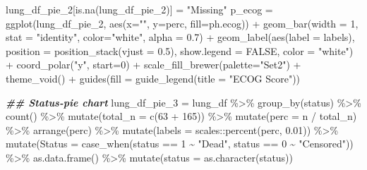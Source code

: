 \documentclass[
]{article}
\newenvironment{Shaded}{\begin{snugshade}}{\end{snugshade}}
\newcommand{\AttributeTok}[1]{\textcolor[rgb]{0.77,0.63,0.00}{#1}}
\newcommand{\ConstantTok}[1]{\textcolor[rgb]{0.00,0.00,0.00}{#1}}
\newcommand{\DecValTok}[1]{\textcolor[rgb]{0.00,0.00,0.81}{#1}}
\newcommand{\DocumentationTok}[1]{\textcolor[rgb]{0.56,0.35,0.01}{\textbf{\textit{#1}}}}
\newcommand{\FloatTok}[1]{\textcolor[rgb]{0.00,0.00,0.81}{#1}}
\newcommand{\FunctionTok}[1]{\textcolor[rgb]{0.00,0.00,0.00}{#1}}
\newcommand{\NormalTok}[1]{#1}
\newcommand{\OtherTok}[1]{\textcolor[rgb]{0.56,0.35,0.01}{#1}}
\newcommand{\SpecialCharTok}[1]{\textcolor[rgb]{0.00,0.00,0.00}{#1}}
\newcommand{\StringTok}[1]{\textcolor[rgb]{0.31,0.60,0.02}{#1}}
\begin{document}
\begin{Shaded}
\begin{Highlighting}[]
\NormalTok{lung\_df\_pie\_2[}\FunctionTok{is.na}\NormalTok{(lung\_df\_pie\_2)] }\OtherTok{=} \StringTok{"Missing"}
\NormalTok{p\_ecog }\OtherTok{=} 
  \FunctionTok{ggplot}\NormalTok{(lung\_df\_pie\_2, }\FunctionTok{aes}\NormalTok{(}\AttributeTok{x=}\StringTok{""}\NormalTok{, }\AttributeTok{y=}\NormalTok{perc, }\AttributeTok{fill=}\NormalTok{ph.ecog)) }\SpecialCharTok{+} 
  \FunctionTok{geom\_bar}\NormalTok{(}\AttributeTok{width =} \DecValTok{1}\NormalTok{, }\AttributeTok{stat =} \StringTok{"identity"}\NormalTok{, }\AttributeTok{color=}\StringTok{"white"}\NormalTok{, }\AttributeTok{alpha =} \FloatTok{0.7}\NormalTok{) }\SpecialCharTok{+} 
  \FunctionTok{geom\_label}\NormalTok{(}\FunctionTok{aes}\NormalTok{(}\AttributeTok{label =}\NormalTok{ labels),}
             \AttributeTok{position =} \FunctionTok{position\_stack}\NormalTok{(}\AttributeTok{vjust =} \FloatTok{0.5}\NormalTok{),}
             \AttributeTok{show.legend =} \ConstantTok{FALSE}\NormalTok{,}
             \AttributeTok{color =} \StringTok{"white"}\NormalTok{) }\SpecialCharTok{+}
  \FunctionTok{coord\_polar}\NormalTok{(}\StringTok{"y"}\NormalTok{, }\AttributeTok{start=}\DecValTok{0}\NormalTok{) }\SpecialCharTok{+}
  \FunctionTok{scale\_fill\_brewer}\NormalTok{(}\AttributeTok{palette=}\StringTok{"Set2"}\NormalTok{) }\SpecialCharTok{+}
  \FunctionTok{theme\_void}\NormalTok{() }\SpecialCharTok{+}
  \FunctionTok{guides}\NormalTok{(}\AttributeTok{fill =} \FunctionTok{guide\_legend}\NormalTok{(}\AttributeTok{title =} \StringTok{"ECOG Score"}\NormalTok{))}

\DocumentationTok{\#\# Status{-}pie chart}
\NormalTok{lung\_df\_pie\_3 }\OtherTok{=}\NormalTok{ lung\_df }\SpecialCharTok{\%\textgreater{}\%}
  \FunctionTok{group\_by}\NormalTok{(status) }\SpecialCharTok{\%\textgreater{}\%} 
  \FunctionTok{count}\NormalTok{() }\SpecialCharTok{\%\textgreater{}\%} 
  \FunctionTok{mutate}\NormalTok{(}\AttributeTok{total\_n =} \FunctionTok{c}\NormalTok{(}\DecValTok{63} \SpecialCharTok{+} \DecValTok{165}\NormalTok{)) }\SpecialCharTok{\%\textgreater{}\%} 
  \FunctionTok{mutate}\NormalTok{(}\AttributeTok{perc =} \StringTok{\textasciigrave{}}\AttributeTok{n}\StringTok{\textasciigrave{}} \SpecialCharTok{/} \StringTok{\textasciigrave{}}\AttributeTok{total\_n}\StringTok{\textasciigrave{}}\NormalTok{) }\SpecialCharTok{\%\textgreater{}\%} 
  \FunctionTok{arrange}\NormalTok{(perc) }\SpecialCharTok{\%\textgreater{}\%}
  \FunctionTok{mutate}\NormalTok{(}\AttributeTok{labels =}\NormalTok{ scales}\SpecialCharTok{::}\FunctionTok{percent}\NormalTok{(perc, }\FloatTok{0.01}\NormalTok{)) }\SpecialCharTok{\%\textgreater{}\%}
  \FunctionTok{mutate}\NormalTok{(}\AttributeTok{Status =} \FunctionTok{case\_when}\NormalTok{(status }\SpecialCharTok{==} \DecValTok{1} \SpecialCharTok{\textasciitilde{}} \StringTok{"Dead"}\NormalTok{,}
\NormalTok{                         status }\SpecialCharTok{==} \DecValTok{0} \SpecialCharTok{\textasciitilde{}} \StringTok{"Censored"}\NormalTok{)) }\SpecialCharTok{\%\textgreater{}\%}
  \FunctionTok{as.data.frame}\NormalTok{() }\SpecialCharTok{\%\textgreater{}\%}
  \FunctionTok{mutate}\NormalTok{(}\AttributeTok{status =} \FunctionTok{as.character}\NormalTok{(status)) }
  

\end{Highlighting}
\end{Shaded}
\end{document}
